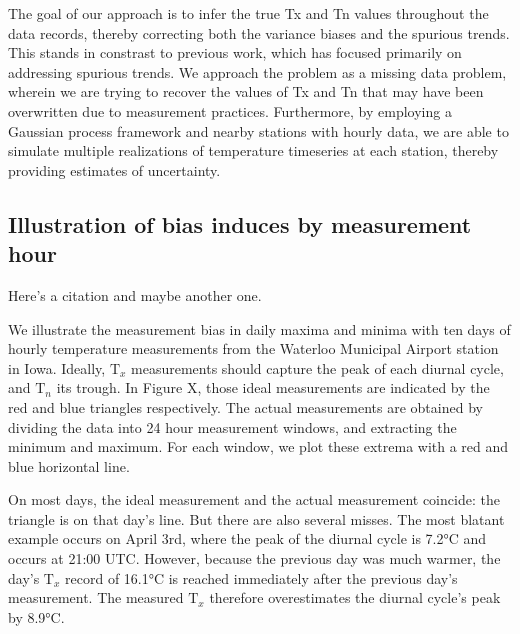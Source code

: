 \documentclass[letter]{article}
\newcommand{\T}{\mathrm{T}}
\newcommand{\Tn}{\T_{n}}
\newcommand{\Tx}{\T_{x}}
\renewcommand{\cite}[1]{\citep{#1}}
\begin{document}
The goal of our approach is to infer the true Tx and Tn values throughout the data records, thereby correcting both the variance biases and the spurious trends. This stands in constrast to previous work, which has focused primarily on addressing spurious trends. We approach the problem as a missing data problem, wherein we are trying to recover the values of Tx and Tn that may have been overwritten due to measurement practices. Furthermore, by employing a Gaussian process framework and nearby stations with hourly data, we are able to simulate multiple realizations of temperature timeseries at each station, thereby providing estimates of uncertainty.
    	\subsection{Illustration of bias induces by measurement
hour}\label{illustration-of-bias-induces-by-measurement-hour}
    


    	Here's a citation \cite{baker1975effect} and maybe another one.
    


    	We illustrate the measurement bias in daily maxima and minima with ten
days of hourly temperature measurements from the Waterloo Municipal
Airport station in Iowa. Ideally, \(\Tx\) measurements should capture
the peak of each diurnal cycle, and \(\Tn\) its trough. In Figure X,
those ideal measurements are indicated by the red and blue triangles
respectively. The actual measurements are obtained by dividing the data
into 24 hour measurement windows, and extracting the minimum and
maximum. For each window, we plot these extrema with a red and blue
horizontal line.

On most days, the ideal measurement and the actual measurement coincide:
the triangle is on that day's line. But there are also several misses.
The most blatant example occurs on April 3rd, where the peak of the
diurnal cycle is 7.2°C and occurs at 21:00 UTC. However, because the
previous day was much warmer, the day's \(\Tx\) record of 16.1°C is
reached immediately after the previous day's measurement. The measured
\(\Tx\) therefore overestimates the diurnal cycle's peak by 8.9°C.
    



    			
    \begin{figure}[tbh]
    \begin{center}
    \end{center}
    { \hspace*{\fill} \\}
	\end{figure}
    
\end{document}
